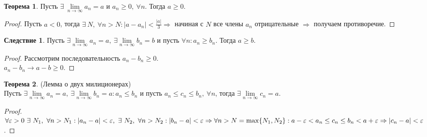 \documentclass[a4paper, 12pt]{article}
\renewcommand{\epsilon}{\varepsilon}
\newcommand{\lims}{\lim\limits_{n\to \infty}}
\theoremstyle{definition}
\newtheorem*{theorem}{Теорема}
\newtheorem*{consequense}{Следствие}
\newtheorem*{comm}{Замечание}
\begin{document}
        \begin{theorem}
            Пусть $\exists\ \lim\limits_{n\to \infty} a_n=a$ и $a_n\geq 0,\ \forall n$. Тогда $a\geq 0$.
        \end{theorem} 
        \begin{proof}
            Пусть $a<0$, тогда $\exists\ N,\ \forall n>N: |a-a_n|<\frac{|a|}{3} \Rightarrow$ начиная с $N$ все члены $a_n$ отрицательные $\Rightarrow$ получаем противоречие.
        \end{proof} 
        \begin{consequense}
            Пусть $\exists \lims a_n =a,\ \exists \lims b_n=b$ и пусть $\forall n: a_n\geq b_n$. Тогда $a\geq b$.
        \end{consequense}  
        \begin{proof}
            Рассмотрим последовательность $a_n-b_n\geq 0$.\\ $a_n-b_n\to a-b\geq 0$.
        \end{proof} 
        \begin{theorem} (Лемма о двух милиционерах)\\
            Пусть $\exists \lims a_n =a,\ \exists \lims b_n=a: a_n\leq b_n$ и пусть $a_n\leq c_n\leq b_n,\ \forall n$, тогда $\exists \lims c_n=a$.
        \end{theorem} 
        \begin{proof}
            $\forall \epsilon>0\ \exists\ N_1,\ \forall n>N_1: |a_n-a|<\epsilon,\ \exists\ N_2,\ \forall n>N_2:\\
            |b_n-a|<\epsilon \Rightarrow \forall n > N=\max\{N_1,N_2\}: a-\epsilon < a_n\leq c_n \leq b_n < a+\epsilon\\
            \Rightarrow |c_n-a|<\epsilon$.
        \end{proof}
\end{document}
